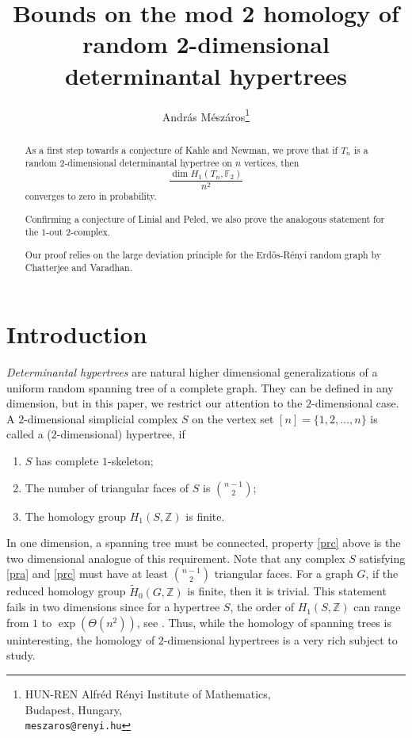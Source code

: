 \documentclass[11pt,a4paper]{article}
\theoremstyle{plain}
\theoremstyle{definition}
\begin{document}
\title{Bounds on the mod 2
homology of random 2-dimensional determinantal hypertrees}
\author{Andr\'as M\'esz\'aros\thanks{HUN-REN Alfr\'ed R\'enyi Institute of Mathematics, \\Budapest, Hungary,\\ {\tt meszaros@renyi.hu}
}}
\date{}

\maketitle
\begin{abstract}
As a first step towards a conjecture of Kahle and Newman, we prove that if $T_n$ is a random $2$-dimensional determinantal hypertree on $n$ vertices, then 
    \[\frac{\dim H_1(T_n,\mathbb{F}_2)}{n^2}\]
    converges to zero in probability.

    Confirming a conjecture of Linial and Peled, we also prove the analogous statement for the $1$-out $2$-complex.

    Our proof relies on the large deviation principle for the Erd\H{o}s-R\'enyi random graph by Chatterjee and Varadhan.



\end{abstract}



\section{Introduction}

\emph{Determinantal hypertrees} are natural higher dimensional generalizations of a uniform random spanning tree of a  complete graph. They can be defined in any dimension, but in this paper, we restrict our attention to the $2$-dimensional case. A $2$-dimensional simplicial complex $S$ on the vertex set $[n]=\{1,2,\dots,n\}$ is called a ($2$-dimensional) hypertree, if
\begin{enumerate}[\hspace{30pt}(a)]
    \item\label{pra} $S$ has complete $1$-skeleton;
    \item\label{prb} The number of triangular faces of $S$ is ${n-1}\choose{2}$;
    \item\label{prc} The homology group $H_{1}(S,\mathbb{Z})$ is finite.
\end{enumerate}

In one dimension, a spanning tree must be connected, property \eqref{prc} above is the two dimensional analogue of this requirement. Note that any complex $S$ satisfying \eqref{pra} and \eqref{prc} must have at least ${n-1}\choose{2}$ triangular faces. For a graph $G$, if the reduced homology group $\tilde{H}_0(G,\mathbb{Z})$ is finite, then it is trivial. This statement fails in two dimensions since for a hypertree $S$, the order of $H_1(S,\mathbb{Z})$ can range from $1$ to $\exp(\Theta(n^2))$, see \cite{kalai1983enumeration}. Thus, while the homology of spanning trees is uninteresting, the homology of $2$-dimensional hypertrees is a very rich subject to study.
\end{document}
